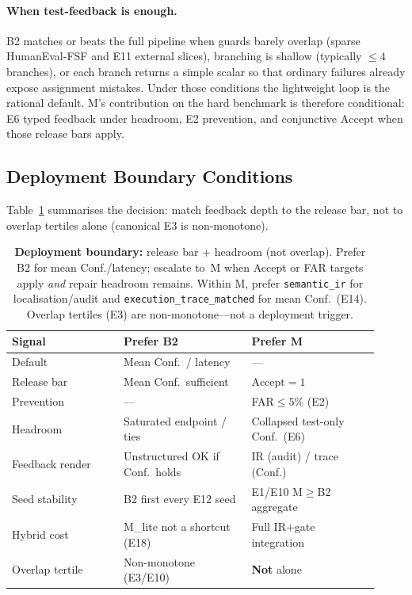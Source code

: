 \paragraph{When test-feedback is enough.}
B2 matches or beats the full pipeline when guards barely overlap (sparse
HumanEval-FSF and E11 external slices), branching is shallow
(typically ${\le}4$ branches), or each branch returns a simple scalar so that
ordinary failures already expose assignment mistakes.
Under those conditions the lightweight loop is the rational default.
M's contribution on the hard benchmark is therefore conditional: E6 typed
feedback under headroom, E2 prevention, and conjunctive $\mathrm{Accept}$
when those release bars apply.

\subsection{Deployment Boundary Conditions}
\label{sec:disc:deployment}

Table~\ref{tab:deployment-boundary} summarises the decision: match feedback
depth to the release bar, not to overlap tertiles alone (canonical E3 is
non-monotone).

\begin{table}[t]
  \centering
  \caption{\textbf{Deployment boundary:} release bar + headroom (not overlap).
    Prefer B2 for mean Conf./latency; escalate to~M when Accept or FAR targets
    apply \emph{and} repair headroom remains.
    Within M, prefer \texttt{semantic\_ir} for localisation/audit and
    \texttt{execution\_trace\_matched} for mean Conf.\ (E14).
    Overlap tertiles (E3) are non-monotone---not a deployment trigger.}
  \label{tab:deployment-boundary}
  \footnotesize
  \renewcommand{\arraystretch}{1.12}
  \begin{tabular}{@{}p{0.28\linewidth}p{0.32\linewidth}p{0.32\linewidth}@{}}
    \toprule
    \textbf{Signal} & \textbf{Prefer B2} & \textbf{Prefer M} \\
    \midrule
    Default & Mean Conf.\ / latency & --- \\
    Release bar & Mean Conf.\ sufficient & $\mathrm{Accept}{=}1$ \\
    Prevention & --- & FAR${\le}5\%$ (E2) \\
    Headroom & Saturated endpoint / ties & Collapsed test-only Conf.\ (E6) \\
    Feedback render & Unstructured OK if Conf.\ holds & IR (audit) / trace (Conf.) \\
    Seed stability & B2 first every E12 seed & E1/E10 M$\ge$B2 aggregate \\
    Hybrid cost & M\_lite not a shortcut (E18) & Full IR$+$gate integration \\
    Overlap tertile & Non-monotone (E3/E10) & \textbf{Not} alone \\
    \bottomrule
  \end{tabular}
\end{table}

